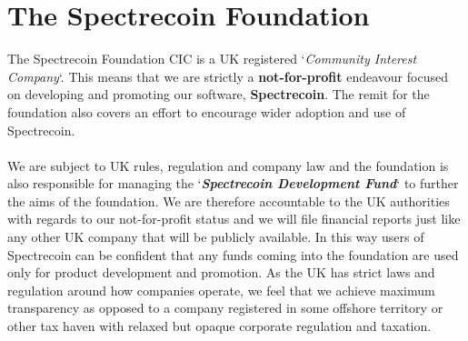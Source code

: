 \section{The Spectrecoin Foundation}
The Spectrecoin Foundation CIC is a UK registered ‘\textit{Community Interest Company}‘.
This means that we are strictly a \textbf{not-for-profit} endeavour focused
on developing and promoting our software, \textbf{Spectrecoin}. The remit
for the foundation also covers an effort to encourage wider adoption and
use of Spectrecoin.
\\
\\
\noindent
We are subject to UK rules, regulation and company law and the foundation
is also responsible for managing the ‘\textbf{\textit{Spectrecoin Development Fund}}‘
to further the aims of the foundation. We are therefore accountable to
the UK authorities with regards to our not-for-profit status and we will
file financial reports just like any other UK company that will be publicly
available. In this way users of Spectrecoin can be confident that any funds
coming into the foundation are used only for product development and
promotion. As the UK has strict laws and regulation around how companies
operate, we feel that we achieve maximum transparency as opposed to a company
registered in some offshore territory or other tax haven with relaxed but
opaque corporate regulation and taxation.



